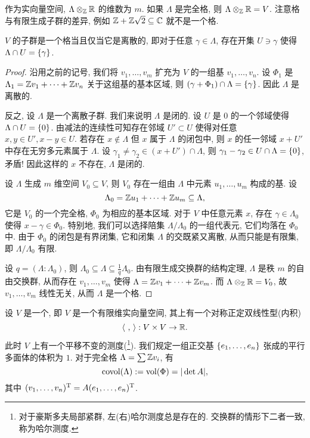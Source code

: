 作为实向量空间, $\Lambda\otimes_{\mathbb{Z}}{\mathbb{R}}$ 的维数为 $m$. 如果 $\Lambda$ 是完全格, 则 $\Lambda\otimes_{\mathbb{Z}}{\mathbb{R}}=V$. 注意格与有限生成子群的差异, 例如 ${\mathbb{Z}}+{\mathbb{Z}}\sqrt{2}\subseteq {\mathbb{C}}$ 就不是一个格.

\begin{proposition}{}{}
$V$ 的子群是一个格当且仅当它是离散的, 即对于任意 $\gamma\in \Lambda$, 存在开集 $U\ni \gamma$ 使得 $\Lambda\cap U=\left\{\gamma\right\}$.
\end{proposition}
\begin{proof}
沿用之前的记号, 我们将 $v_1,\dots,v_m$ 扩充为 $V$ 的一组基 $v_1,\dots,v_n$. 设 $\Phi_1$ 是 $\Lambda_1={\mathbb{Z}} v_1+\cdots+{\mathbb{Z}} v_n$ 关于这组基的基本区域, 则 $(\gamma+\Phi_1)\cap \Lambda=\left\{\gamma\right\}$. 因此 $\Lambda$ 是离散的.

反之, 设 $\Lambda$ 是一个离散子群. 我们来说明 $\Lambda$ 是闭的. 设 $U$ 是 $0$ 的一个邻域使得 $\Lambda\cap U=\left\{0\right\}$. 由减法的连续性可知存在邻域 $U'\subset U$ 使得对任意 $x,y\in U', x-y\in U$. 若存在 $x\notin \Lambda$ 但 $x$ 属于 $\Lambda$ 的闭包中, 则 $x$ 的任一邻域 $x+U'$ 中存在无穷多元素属于 $\Lambda$. 设 $\gamma_1\neq\gamma_2\in (x+U')\cap\Lambda$, 则 $\gamma_1-\gamma_2\in U\cap\Lambda=\left\{0\right\}$, 矛盾! 因此这样的 $x$ 不存在, $\Lambda$ 是闭的.

设 $\Lambda$ 生成 $m$ 维空间 $V_0\subseteq V$, 则 $V_0$ 存在一组由 $\Lambda$ 中元素 $u_1,\dots,u_m$ 构成的基. 设
	\[\Lambda_0={\mathbb{Z}} u_1+\cdots+{\mathbb{Z}} u_m\subseteq \Lambda,\]
它是 $V_0$ 的一个完全格, $\Phi_0$ 为相应的基本区域. 对于 $V$ 中任意元素 $x$, 存在 $\gamma\in\Lambda_0$ 使得 $x-\gamma\in\Phi_0$. 特别地, 我们可以选择陪集 $\Lambda/\Lambda_0$ 的一组代表元, 它们均落在 $\Phi_0$ 中. 由于 $\Phi_0$ 的闭包是有界闭集, 它和闭集 $\Lambda$ 的交既紧又离散, 从而只能是有限集, 即 $\Lambda/\Lambda_0$ 有限. 

设 $q=(\Lambda:\Lambda_0)$, 则 $\Lambda_0\subseteq \Lambda\subseteq \frac{1}{q}\Lambda_0$. 由有限生成交换群的结构定理, $\Lambda$ 是秩 $m$ 的自由交换群, 从而存在 $v_1,\dots,v_m$ 使得 $\Lambda={\mathbb{Z}} v_1+\cdots+{\mathbb{Z}} v_m$. 而 $\Lambda\otimes_{\mathbb{Z}}{\mathbb{R}}=V_0$, 故 $v_1,\dots,v_m$ 线性无关, 从而 $\Lambda$ 是一个格.
\end{proof}

设 $V$ 是一个, 即 $V$ 是一个有限维实向量空间, 其上有一个对称正定双线性型(内积)
  \[\langle{\ ,\ }\rangle: V\times V\to {\mathbb{R}}.\]
此时 $V$ 上有一个平移不变的测度(\footnote{对于豪斯多夫局部紧群, 左(右)哈尔测度总是存在的. 交换群的情形下二者一致, 称为哈尔测度.}). 我们规定一组正交基 $\left\{e_1,\dots,e_n\right\}$ 张成的平行多面体的体积为 $1$.
对于完全格 $\Lambda=\sum {\mathbb{Z}} v_i$, 有
  \[{\mathrm{covol}}(\Lambda):={\mathrm{vol}}(\Phi)=|\det A|,\]
其中 $(v_1,\dots,v_n)^{\mathrm{T}}=A(e_1,\dots,e_n)^{\mathrm{T}}$.

